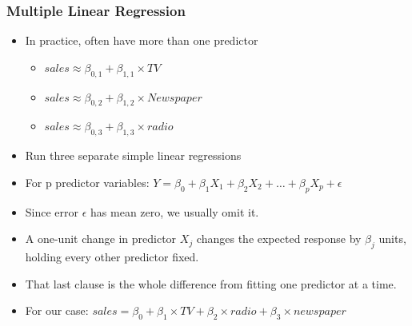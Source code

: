 




\begin{frame}[fragile]\frametitle{Multiple Linear Regression}
\begin{itemize}
\item In practice, often have more than one predictor
\begin{itemize}
\item $sales \approx \beta_{0,1} + \beta_{1,1} \times TV$
\item $sales \approx \beta_{0,2} + \beta_{1,2} \times Newspaper$
\item $sales \approx \beta_{0,3} + \beta_{1,3} \times radio$
\end{itemize}
\item Run three separate simple linear regressions
\item For p predictor variables:
$ Y = \beta_0 + \beta_1 X_1 + \beta_2 X_2 + \ldots + \beta_p X_p + \epsilon$
\item Since error $\epsilon$ has mean zero, we usually omit it.
\item A one-unit change in predictor $X_j$ changes the expected response by $\beta_j$ units, holding every other predictor fixed.
\item That last clause is the whole difference from fitting one predictor at a time.
\item For our case:
$ sales = \beta_0 + \beta_1 \times TV + \beta_2 \times radio + \beta_3 \times newspaper$
\end{itemize}
\end{frame}


